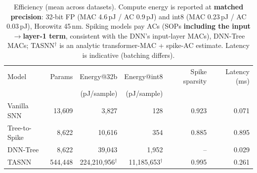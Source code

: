 \begin{table}[t]
\centering
\caption{Efficiency (mean across datasets). Compute energy is reported at \textbf{matched precision}: 32-bit FP (MAC 4.6\,pJ / AC 0.9\,pJ) and int8 (MAC 0.23\,pJ / AC 0.03\,pJ), Horowitz 45\,nm. Spiking models pay ACs (SOPs \textbf{including the input$\to$layer-1 term}, consistent with the DNN's input-layer MACs), DNN-Tree MACs; TASNN$^{\dagger}$ is an analytic transformer-MAC + spike-AC estimate. Latency is indicative (batching differs).}
\label{tab:efficiency}
\footnotesize
\setlength{\tabcolsep}{4pt}
\begin{tabular}{lrrrrr}
\toprule
Model & Params & Energy@32b & Energy@int8 & Spike sparsity & Latency (ms) \\
& & (pJ/sample) & (pJ/sample) & & \\
\midrule
Vanilla SNN & 13,609 & 3,827 & 128 & 0.923 & 0.071 \\
Tree-to-Spike & 8,622 & 10,616 & 354 & 0.885 & 0.895 \\
DNN-Tree & 8,622 & 39,043 & 1,952 & -- & 0.029 \\
TASNN & 544,448 & 224,210,956$^{\dagger}$ & 11,185,653$^{\dagger}$ & 0.995 & 0.261 \\
\bottomrule
\end{tabular}
\end{table}

